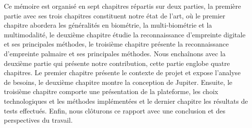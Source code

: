 Ce mémoire est organisé en sept chapitres répartis sur deux parties, la première partie avec ses trois chapitres constituent notre état de l'art, où le premier chapitre abordera les généralités en biométrie, la multi-biométrie et la multimodalité, le deuxième chapitre étudie la reconnaissance d'empreinte digitale et ses principales méthodes, le troisième chapitre présente la reconnaissance d'empreinte palmaire et ses principales méthodes. Nous enchaînons avec la deuxième partie qui présente notre contribution, cette partie englobe quatre chapitres. Le premier chapitre présente le contexte de projet et expose l'analyse de besoins, le deuxième chapitre montre la conception de Jupiter. Ensuite, le troisième chapitre comporte une présentation de la plateforme, les choix technologiques et les méthodes implémentées et le dernier chapitre les résultats de tests effectués. Enfin, nous clôturons ce rapport avec une conclusion et des perspectives du travail.
